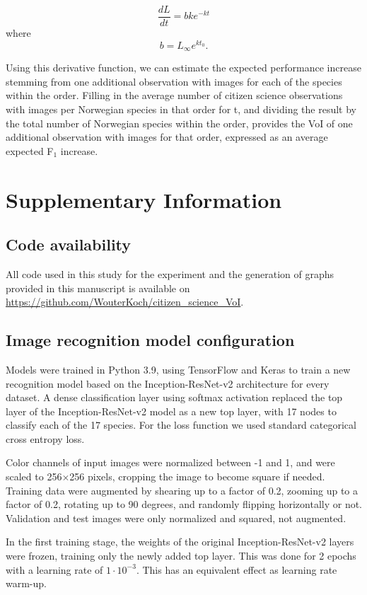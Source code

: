 \documentclass{article}
\begin{document}
\[ \frac{dL}{dt} = bke^{-kt} \]
where
\[ b = L_\infty e^{kt_0}. \]

Using this derivative function, we can estimate the expected performance increase stemming from one additional observation with images for each of the species within the order. Filling in the average number of citizen science observations with images per Norwegian species in that order for t, and dividing the result by the total number of Norwegian species within the order, provides the VoI of one additional observation with images for that order, expressed as an average expected F\(_1\) increase.

\printbibliography 

\newpage

\section*{Supplementary Information}
\subsection*{Code availability}
All code used in this study for the experiment and the generation of graphs provided in this manuscript is available on \url{https://github.com/WouterKoch/citizen_science_VoI}.

\subsection*{Image recognition model configuration}
\label{sec:model}
Models were trained in Python 3.9\autocite{python}, using TensorFlow\autocite{tensorflow} and Keras\autocite{keras} to train a new recognition model based on the Inception-ResNet-v2 architecture\autocite{szegedy2016inceptionv4} for every dataset. A dense classification layer using softmax activation replaced the top layer of the Inception-ResNet-v2 model as a new top layer, with 17 nodes to classify each of the 17 species. For the loss function we used standard categorical cross entropy loss.

Color channels of input images were normalized between -1 and 1, and were scaled to 256\(\times\)256 pixels, cropping the image to become square if needed. Training data were augmented by shearing up to a factor of 0.2, zooming up to a factor of 0.2, rotating up to 90 degrees, and randomly flipping horizontally or not. Validation and test images were only normalized and squared, not augmented.

In the first training stage, the weights of the original Inception-ResNet-v2 layers were frozen, training only the newly added top layer. This was done for 2 epochs with a learning rate of \(1\cdot10^{-3}\). This has an equivalent effect as learning rate warm-up.
\end{document}
